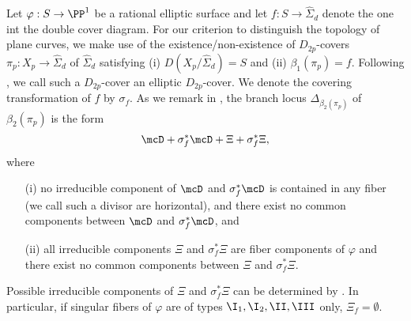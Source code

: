 Let $\varphi : S \to \PP^1$ be a rational elliptic surface and let $f : S \to \widehat{\Sigma}_d$ denote the one 
int the double cover diagram.  For our criterion to distinguish  the topology of plane curves, we make use  of the existence/non-existence
 of $D_{2p}$-covers $\pi_p : X_p \to \widehat{\Sigma}_d$ of $\widehat{\Sigma}_d$ satisfying  (i) $D(X_p/\widehat{\Sigma}_d) = 
 S$ and (ii) $\beta_1(\pi_p) = f$.  Following \cite{tokunaga14}, we call such a $D_{2p}$-cover  an
 elliptic $D_{2p}$-cover. We denote the covering transformation of $f$ by $\sigma_f$. 
 As we remark in \cite[\S 3]{tokunaga14}, the branch locus $\Delta_{\beta_2(\pi_p)}$ of 
 $\beta_2(\pi_p)$ is the form
 \[
 \mcD + \sigma_f^*\mcD + \Xi + \sigma_f^*\Xi,
 \]
 where
 \begin{enumerate}
  
  \item[(i)]  no irreducible component of $\mcD$ and $\sigma_f^*\mcD$ is contained in any fiber (we call such a divisor are horizontal), and
  there exist no common components between $\mcD$ and $\sigma_f^*\mcD$,  and
 
 \item[(ii)] all irreducible components $\Xi$ and $\sigma_f^*\Xi$ are fiber components of $\varphi$ and 
 there exist no common components between $\Xi$ and $\sigma_f^*\Xi$.
 
 \end{enumerate}
 
 \begin{rem}\label{rem:components} { \rm Possible irreducible components of $\Xi$ and $\sigma_f^*\Xi$ can be determined by
  \cite[Remark 3.1]{tokunaga14}. In particular, if singular fibers of $\varphi$ are of types $\I_1, \I_2, \II, \III$ only,
  $\Xi_f = \emptyset$.
 }
 \end{rem}
 
